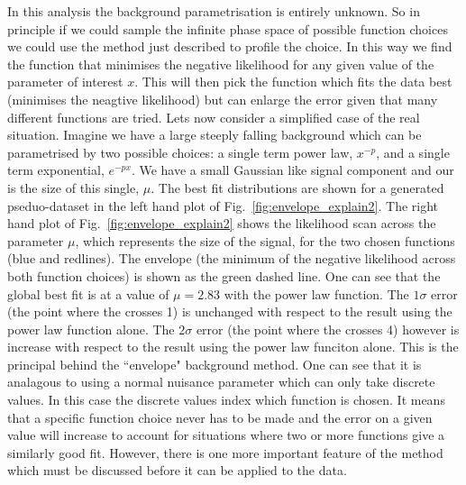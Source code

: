 In this analysis the background parametrisation is entirely unknown. So in principle if we could sample the infinite phase space of possible function choices we could use the method just described to profile the choice. In this way we find the function that minimises the negative likelihood for any given value of the parameter of interest $x$. This will then pick the function which fits the data best (minimises the neagtive likelihood) but can enlarge the error given that many different functions are tried.
Lets now consider a simplified case of the real situation. Imagine we have a large steeply falling background which can be parametrised by two possible choices: a single term power law, $x^{-p}$, and a single term exponential, $e^{-px}$. We have a small Gaussian like signal component and our \POI is the size of this single, $\mu$. The best fit distributions are shown for a generated pseduo-dataset in the left hand plot of Fig.~\ref{fig:envelope_explain2}. The right hand plot of Fig.~\ref{fig:envelope_explain2} shows the likelihood scan across the parameter $\mu$, which represents the size of the signal, for the two chosen functions (blue and redlines). The envelope (the minimum of the negative likelihood across both function choices) is shown as the green dashed line. One can see that the global best fit is at a value of $\mu=2.83$ with the power law function. The $1\sigma$ error (the point where the \NLL crosses 1) is unchanged with respect to the result using the power law function alone. The $2\sigma$ error (the point where the \NLL crosses 4) however is increase with respect to the result using the power law funciton alone. This is the principal behind the ``envelope" background method. One can see that it is analagous to using a normal nuisance parameter which can only take discrete values. In this case the discrete values index which function is chosen. It means that a specific function choice never has to be made and the error on a given value will increase to account for situations where two or more functions give a similarly good fit. However, there is one more important feature of the method which must be discussed before it can be applied to the data.

